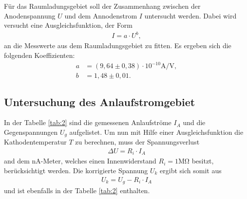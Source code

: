 Für das Raumladungsgebiet soll der Zusammenhang
zwischen der Anodenspannung $U$ und dem Annodenstrom $I$ untersucht
werden.
Dabei wird versucht eine Ausgleichsfunktion, der Form
\begin{align}
  I=a\cdot U^{b},
\end{align}
an die Messwerte aus dem Raumladungsgebiet zu fitten.
Es ergeben sich die folgenden Koeffizienten:
\begin{align*}
a&=(9,64\pm0,38)\cdot10^{-10}\si{\ampere\per\volt},\\
b&=1,48\pm0,01.
\end{align*}




\subsection{Untersuchung des Anlaufstromgebiet}
In der Tabelle \ref{tab:2} sind die gemessenen Anlaufströme $I_A$
und die Gegenspannungen $U_g$ aufgelistet.
Um nun mit Hilfe einer Ausgleichsfunktion die Kathodentemperatur $T$
zu berechnen, muss der Spannungsverlust
\begin{align*}
  \Delta U=R_i\cdot I_A
\end{align*}
and dem nA-Meter, welches einen Innenwiderstand $R_i=1\si{\mega\ohm}$ besitzt,
berücksichtigt werden.
Die korrigierte Spannung $U_k$ ergibt sich somit aus
\begin{align}
U_k=U_g-R_i\cdot I_A \label{eqn:U_k}
\end{align}
und ist ebenfalls in der Tabelle \ref{tab:2} enthalten.

